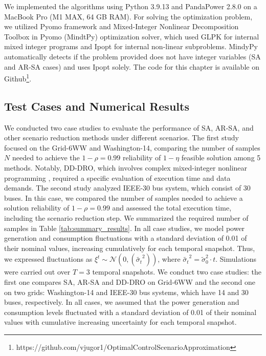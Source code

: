 We implemented the algorithms using Python 3.9.13 and PandaPower 2.8.0 \cite{pandapower.2018} on a MacBook Pro (M1 MAX, 64 GB RAM). For solving the optimization problem, we utilized Pyomo framework \cite{hart2017pyomo} and Mixed-Integer Nonlinear Decomposition Toolbox in Pyomo (MindtPy)   \cite{bernal2018mixed} optimization solver, which used GLPK \cite{Oki2012GLPKL} for internal mixed integer programs and Ipopt \cite{wachter2006implementation} for internal non-linear subproblems. MindyPy automatically detects if the problem provided does not have integer variables (SA and AR-SA cases) and uses Ipopt solely. 
The code for this chapter is available on Github\footnote{https://github.com/vjugor1/OptimalControlScenarioApproximation}.
\subsection{Test Cases and Numerical Results}
We conducted two case studies to evaluate the performance of SA, AR-SA, and other scenario reduction methods under different scenarios.  The first study focused on the Grid-6WW and Washington-14, comparing the number of samples $N$ needed to achieve the $1-\rho=0.99$ reliability of $1-\eta$ feasible solution among 5 methods. 
Notably, DD-DRO, which involves complex mixed-integer nonlinear programming \cite{chen2024data}, required a specific evaluation of execution time and data demands.
The second study analyzed IEEE-30 bus system, which consist of 30 buses. 
In this case, we compared the number of samples needed to achieve a solution reliability of $1-\rho=0.99$ and assessed the total execution time, including the scenario reduction step. We summarized the required number of samples in Table \ref{tab:summary_results}.
%
In all case studies, we model power generation and consumption fluctuations with a standard deviation of 0.01 of their nominal values, increasing cumulatively for each temporal snapshot. Thus, we expressed fluctuations as $\xi^t \sim \mathcal{N}(0, (\tilde{\sigma_t}^2))$, where $\tilde{\sigma_t}^2 = \tilde{\sigma}_0^2 \cdot t$. Simulations were carried out over $T=3$ temporal snapshots.%
We conduct two case studies: the first one compares SA, AR-SA and DD-DRO on Grid-6WW and the second one on two grids: Washington-14 and IEEE-30 bus systems, which have 14 and 30 buses, respectively. In all cases, we assumed that the power generation and consumption levels fluctuated with a standard deviation of 0.01 of their nominal values with cumulative increasing uncertainty for each temporal snapshot.

